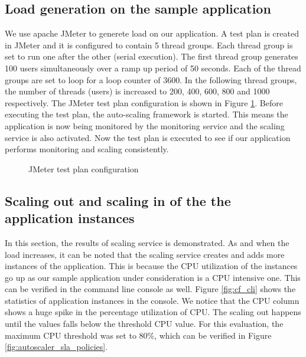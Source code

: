 \documentclass[article,type=msc,colorback,12pt,accentcolor=tud8b,table]{tudthesis}
\begin{document}
	\subsection{Load generation on the sample application}
	
 We use apache JMeter to generete load on our application. A test plan is created in JMeter and it is configured to contain 5 thread groups. Each thread group is set to run one after the other (serial execution). The first thread group generates 100 users simultaneously over a ramp up period of 50 seconds. Each of the thread groups are set to loop for a loop counter of 3600. In the following thread groups, the number of threads (users) is increased to 200, 400, 600, 800 and 1000 respectively. The JMeter test plan configuration is shown in Figure \ref{fig:jmeter_testplan}. Before executing the test plan, the auto-scaling framework is started. This means the application is now being monitored by the monitoring service and the scaling service is also activated. Now the test plan is executed to see if our application performs monitoring and scaling consistently.
 
  \begin{figure}[h]
  	\begin{center}
  		\makebox[\textwidth]{\texttt{[image: E3]}}
  	\end{center}
  	\caption{JMeter test plan configuration}
  	\label{fig:jmeter_testplan}
  \end{figure}
	
	\subsection{Scaling out and scaling in of the the application instances}
		
	In this section, the results of scaling service is demonstrated. As and when the load increases, it can be noted that the scaling service creates and adds more instances of the application. This is because the CPU utilization of the instances go up as our sample application under consideration is a CPU intensive one. This can be verified in the command line console as well. Figure \ref{fig:cf_cli} shows the statistics of application instances in the console. We notice that the CPU column shows a huge spike in the percentage utilization of CPU. The scaling out happens until the values falls below the threshold CPU value. For this evaluation, the maximum CPU threshold was set to 80\%, which can be verified in Figure \ref{fig:autoscaler_sla_policies}.
	
\end{document}
